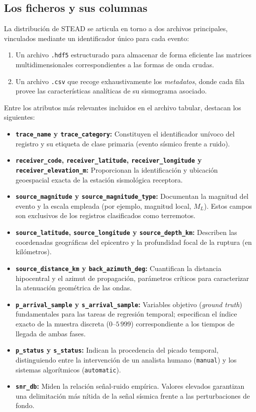 \subsection{Los ficheros y sus columnas}
La distribución de STEAD se articula en torno a dos archivos principales, vinculados mediante un identificador único para cada evento:
\begin{enumerate}
  \item Un archivo \texttt{.hdf5} estructurado para almacenar de forma eficiente las matrices multidimensionales correspondientes a las formas de onda crudas.
  \item Un archivo \texttt{.csv} que recoge exhaustivamente los \emph{metadatos}, donde cada fila provee las características analíticas de su sismograma asociado.
\end{enumerate}

Entre los atributos más relevantes incluidos en el archivo tabular, destacan los siguientes:

\begin{itemize}
  \item \textbf{\texttt{trace\_name} y \texttt{trace\_category}:} Constituyen el identificador unívoco del registro y su etiqueta de clase primaria (evento sísmico frente a ruido).
  \item \textbf{\texttt{receiver\_code}, \texttt{receiver\_latitude}, \texttt{receiver\_longitude} y \texttt{receiver\_elevation\_m}:} Proporcionan la identificación y ubicación geoespacial exacta de la estación sismológica receptora.
  \item \textbf{\texttt{source\_magnitude} y \texttt{source\_magnitude\_type}:} Documentan la magnitud del evento y la escala empleada (por ejemplo, magnitud local, $M_L$). Estos campos son exclusivos de los registros clasificados como terremotos.
  \item \textbf{\texttt{source\_latitude}, \texttt{source\_longitude} y \texttt{source\_depth\_km}:} Describen las coordenadas geográficas del epicentro y la profundidad focal de la ruptura (en kilómetros).
  \item \textbf{\texttt{source\_distance\_km} y \texttt{back\_azimuth\_deg}:} Cuantifican la distancia hipocentral y el azimut de propagación, parámetros críticos para caracterizar la atenuación geométrica de las ondas.
  \item \textbf{\texttt{p\_arrival\_sample} y \texttt{s\_arrival\_sample}:} Variables objetivo (\textit{ground truth}) fundamentales para las tareas de regresión temporal; especifican el índice exacto de la muestra discreta ($0$--$5\,999$) correspondiente a los tiempos de llegada de ambas fases.
  \item \textbf{\texttt{p\_status} y \texttt{s\_status}:} Indican la procedencia del picado temporal, distinguiendo entre la intervención de un analista humano (\texttt{manual}) y los sistemas algorítmicos (\texttt{automatic}).
  \item \textbf{\texttt{snr\_db}:} Miden la relación señal-ruido empírica. Valores elevados garantizan una delimitación más nítida de la señal sísmica frente a las perturbaciones de fondo.
\end{itemize}

